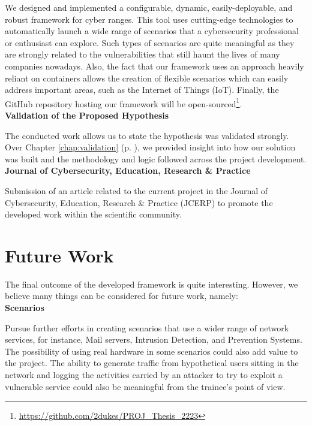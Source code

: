 We designed and implemented a configurable, dynamic, easily-deployable, and robust framework for cyber ranges. This tool uses cutting-edge technologies to automatically launch a wide range of scenarios that a cybersecurity professional or enthusiast can explore. Such types of scenarios are quite meaningful as they are strongly related to the vulnerabilities that still haunt the lives of many companies nowadays. Also, the fact that our framework uses an approach heavily reliant on containers allows the creation of flexible scenarios which can easily address important areas, such as the Internet of Things (IoT). Finally, the GitHub repository hosting our framework will be open-sourced\footnote{\url{https://github.com/2dukes/PROJ_Thesis_2223}}.\\

\textbf{Validation of the Proposed Hypothesis}

The conducted work allows us to state the hypothesis was validated strongly. Over Chapter \ref{chap:validation} (p. \pageref{chap:validation}), we provided insight into how our solution was built and the methodology and logic followed across the project development.\\

\textbf{Journal of Cybersecurity, Education, Research \& Practice}

Submission of an article related to the current project in the Journal of Cybersecurity, Education, Research \& Practice (JCERP) to promote the developed work within the scientific community. 

\section{Future Work} \label{sec:future_work}

The final outcome of the developed framework is quite interesting. However, we believe many things can be considered for future work, namely:\\

\textbf{Scenarios}

Pursue further efforts in creating scenarios that use a wider range of network services, for instance, Mail servers, Intrusion Detection, and Prevention Systems. The possibility of using real hardware in some scenarios could also add value to the project. The ability to generate traffic from hypothetical users sitting in the network and logging the activities carried by an attacker to try to exploit a vulnerable service could also be meaningful from the trainee's point of view.\\

